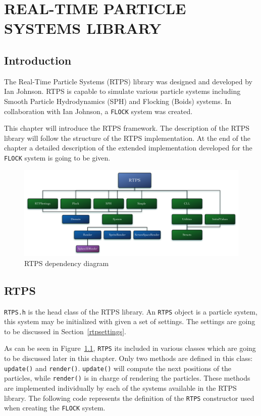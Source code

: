 \chapter{REAL-TIME PARTICLE SYSTEMS LIBRARY}\label{RTPSchapter}

\section{Introduction}
The Real-Time Particle Systems (RTPS) library was designed and developed by Ian Johnson\cite{ianPaper}. RTPS is capable to simulate various particle systems including Smooth Particle Hydrodynamics (SPH) and Flocking (Boids) systems. In collaboration with Ian Johnson, a \texttt{FLOCK} system was created.

This chapter will introduce the RTPS framework. The description of the RTPS library will follow the structure of the RTPS implementation. At the end of the chapter a detailed description of the extended implementation developed for the \texttt{FLOCK} system is going to be given. 

\begin{figure}[htbp]
\begin{center}
\includegraphics[scale=0.30]{figures/RTPSdiagram.pdf}
\caption{RTPS dependency diagram}
\label{RTPSdiagram}
\end{center}
\end{figure}

\section{RTPS}\label{rtpssection}
\texttt{RTPS.h} is the head class of the RTPS library. An \texttt{RTPS} object is a particle system, this system may be initialized with given a set of settings. The settings are going to be discussed in Section~\ref{rtpsettings}. 

As can be seen in Figure~\ref{RTPSdiagram}, \texttt{RTPS} its included in various classes which are going to be discussed later in this chapter. Only two methods are defined in this class: \texttt{update()} and \texttt{render()}. \texttt{update()} will compute the next positions of the particles, while \texttt{render()} is in charge of rendering the particles. These methods are implemented individually by each of the systems available in the RTPS library. The following code represents the definition of the \texttt{RTPS} constructor used when creating the \texttt{FLOCK} system.

